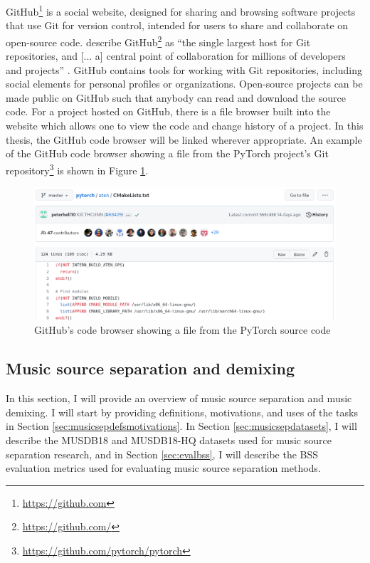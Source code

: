 \documentclass[report.tex]{subfiles}
\begin{document}
GitHub\footnote{\url{https://github.com}} is a social website, designed for sharing and browsing software projects that use Git for version control, intended for users to share and collaborate on open-source code. \citeauthor{gitbook} describe GitHub\footnote{\url{https://github.com/}} as ``the single largest host for Git repositories, and [... a] central point of collaboration for millions of developers and projects'' \parencite[131]{gitbook}. GitHub contains tools for working with Git repositories, including social elements for personal profiles or organizations. Open-source projects can be made public on GitHub such that anybody can read and download the source code. For a project hosted on GitHub, there is a file browser built into the website which allows one to view the code and change history of a project. In this thesis, the GitHub code browser will be linked wherever appropriate. An example of the GitHub code browser showing a file from the PyTorch project's Git repository\footnote{\url{https://github.com/pytorch/pytorch}} is shown in Figure \ref{fig:githubpytorch}.

\begin{figure}[ht]
	\centering
	\includegraphics[width=\textwidth]{./images-misc/github.png}
	\caption{GitHub's code browser showing a file from the PyTorch source code}
	\label{fig:githubpytorch}
\end{figure}

\newpagefill

\subsection{Music source separation and demixing}
\label{sec:musicsep}

In this section, I will provide an overview of music source separation and music demixing. I will start by providing definitions, motivations, and uses of the tasks in Section \ref{sec:musicsepdefsmotivations}. In Section \ref{sec:musicsepdatasets}, I will describe the MUSDB18 and MUSDB18-HQ datasets used for music source separation research, and in Section \ref{sec:evalbss}, I will describe the BSS evaluation metrics used for evaluating music source separation methods.
\end{document}
